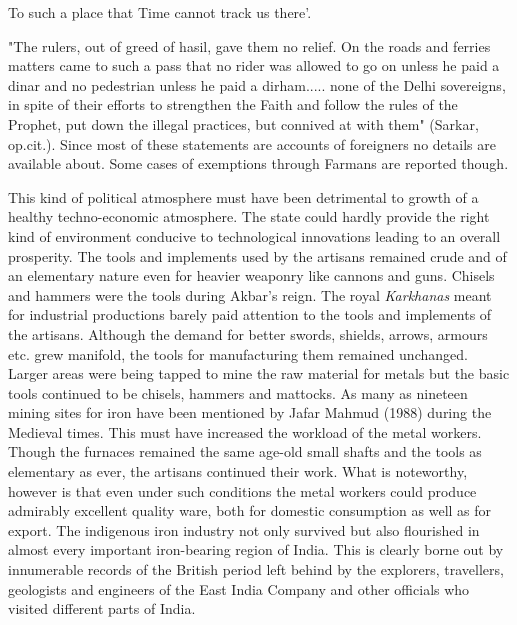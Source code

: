 To such a place that Time cannot track us there’.

"The rulers, out of greed of hasil, gave them no relief.  On the roads and ferries matters came to such a pass that no rider was allowed to go on unless he paid a dinar and no pedestrian unless he paid a dirham..... none of the Delhi sovereigns, in spite of their efforts to strengthen the Faith and follow the rules of the Prophet, put down the illegal practices, but connived at with them" (Sarkar, op.cit.).  Since most of these statements are accounts of foreigners no details are available about. Some cases of exemptions through Farmans are reported though. 

This kind of political atmosphere must have been detrimental to growth of a healthy techno-economic atmosphere. The state could hardly provide the right kind of environment conducive to technological innovations leading to an overall prosperity.  The tools and implements used by the artisans remained crude and of an elementary nature even for heavier weaponry like cannons and guns. Chisels and hammers were the tools during Akbar’s reign.  The royal {\it Karkhanas} meant for industrial productions barely paid attention to the tools and implements of the artisans.  Although the demand for better swords, shields, arrows, armours etc. grew manifold, the tools for manufacturing them remained unchanged.  Larger areas were being tapped to mine the raw material for metals but the basic tools continued to be chisels, hammers and mattocks.  As many as nineteen mining sites for iron have been mentioned by Jafar Mahmud (1988) during the Medieval times.  This must have increased the workload of the metal workers.  Though the furnaces remained the same age-old small shafts and the tools as elementary as ever, the artisans continued their work. What is noteworthy, however is that even under such conditions the metal workers could produce admirably excellent quality ware, both for domestic consumption as well as for export. The indigenous iron industry not only survived but also flourished in almost every important iron-bearing region of India. This is clearly borne out by innumerable records of the British period left behind by the explorers, travellers, geologists and engineers of the East India Company and other officials who visited different parts of India.

\theendnotes
